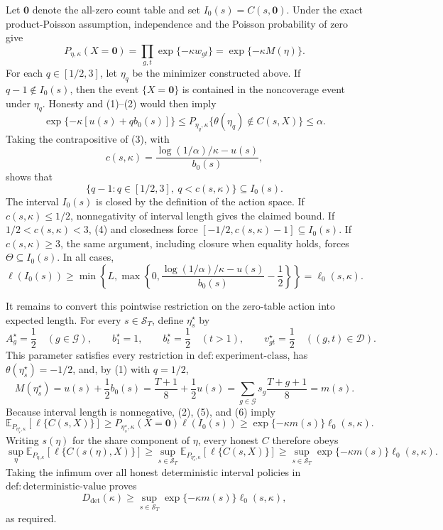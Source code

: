 Let \(\mathbf 0\) denote the all-zero count table and set \(I_0(s)=C(s,\mathbf 0)\).  Under the exact product-Poisson assumption, independence and the Poisson probability of zero give
\[
 P_{\eta,\kappa}(X=\mathbf 0)
 =\prod_{g,t}\exp\{-\kappa w_{gt}\}
 =\exp\{-\kappa M(\eta)\}.
 \tag{2}
\]
For each \(q\in[1/2,3]\), let \(\eta_q\) be the minimizer constructed above.  If \(q-1\notin I_0(s)\), then the event \(\{X=\mathbf 0\}\) is contained in the noncoverage event under \(\eta_q\).  Honesty and (1)--(2) would then imply
\[
 \exp\{-\kappa[u(s)+qb_0(s)]\}
 \le P_{\eta_q,\kappa}\{\theta(\eta_q)\notin C(s,X)\}
 \le\alpha.
 \tag{3}
\]
Taking the contrapositive of (3), with
\[
 c(s,\kappa)=
 \frac{\log(1/\alpha)/\kappa-u(s)}{b_0(s)},
\]
shows that
\[
 \{q-1:q\in[1/2,3],\ q<c(s,\kappa)\}\subseteq I_0(s).
 \tag{4}
\]
The interval \(I_0(s)\) is closed by the definition of the action space.  If \(c(s,\kappa)\le1/2\), nonnegativity of interval length gives the claimed bound.  If \(1/2<c(s,\kappa)<3\), (4) and closedness force \([-1/2,c(s,\kappa)-1]\subseteq I_0(s)\).  If \(c(s,\kappa)\ge3\), the same argument, including closure when equality holds, forces \(\Theta\subseteq I_0(s)\).  In all cases,
\[
 \ell(I_0(s))
 \ge
 \min\!\left\{L,
 \max\!\left\{0,
 \frac{\log(1/\alpha)/\kappa-u(s)}{b_0(s)}-\frac12
 \right\}\right\}
 =\ell_0(s,\kappa).
 \tag{5}
\]

It remains to convert this pointwise restriction on the zero-table action into expected length.  For every \(s\in\mathcal S_T\), define \(\eta_s^{\star}\) by
\[
 A_g^{\star}=\frac12\quad(g\in\mathcal G),\qquad
 b_1^{\star}=1,\qquad b_t^{\star}=\frac12\quad(t>1),\qquad
 v_{gt}^{\star}=\frac12\quad((g,t)\in\mathcal D).
\]
This parameter satisfies every restriction in \(\mathrm{def{:}experiment\text{-}class}\), has \(\theta(\eta_s^{\star})=-1/2\), and, by (1) with \(q=1/2\),
\[
 M(\eta_s^{\star})
 =u(s)+\frac12b_0(s)
 =\frac{T+1}{8}+\frac12u(s)
 =\sum_{g\in\mathcal G}s_g\frac{T+g+1}{8}
 =m(s).
 \tag{6}
\]
Because interval length is nonnegative, (2), (5), and (6) imply
\[
 \mathbb E_{P_{\eta_s^{\star},\kappa}}\!\left[\ell\{C(s,X)\}\right]
 \ge P_{\eta_s^{\star},\kappa}(X=\mathbf 0)\ell(I_0(s))
 \ge \exp\{-\kappa m(s)\}\ell_0(s,\kappa).
\]
Writing \(s(\eta)\) for the share component of \(\eta\), every honest \(C\) therefore obeys
\[
 \sup_{\eta}\mathbb E_{P_{\eta,\kappa}}\!\left[\ell\{C(s(\eta),X)\}\right]
 \ge
 \sup_{s\in\mathcal S_T}
 \mathbb E_{P_{\eta_s^{\star},\kappa}}\!\left[\ell\{C(s,X)\}\right]
 \ge
 \sup_{s\in\mathcal S_T}\exp\{-\kappa m(s)\}\ell_0(s,\kappa).
\]
Taking the infimum over all honest deterministic interval policies in \(\mathrm{def{:}deterministic\text{-}value}\) proves
\[
 D_{\mathrm{det}}(\kappa)
 \ge\sup_{s\in\mathcal S_T}\exp\{-\kappa m(s)\}\ell_0(s,\kappa),
\]
as required.
